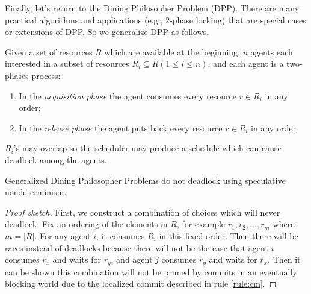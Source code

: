 Finally, let's return to the Dining Philosopher Problem (DPP).
There are many practical algorithms and applications (e.g., 2-phase locking)
that are special cases or extensions of DPP. So we generalize DPP as follows.
\begin{definition}
Given a set of resources $R$ which are available at the beginning, 
$n$ agents each interested in a subset of resources 
$R_i\subseteq R (1\le i\le n)$, and each agent is a two-phases process:
  \begin{enumerate}
    \item In the \emph{acquisition phase} the agent consumes every resource $r\in R_i$ in any order;
    \item In the \emph{release phase} the agent puts back every resource $r\in R_i$ in any order.
  \end{enumerate}
  $R_i$'s may overlap so the scheduler may produce a schedule which can cause deadlock 
among the agents.
\end{definition}

\begin{theorem} Generalized Dining Philosopher Problems do not deadlock 
using speculative nondeterminism.
\end{theorem}
\begin{proof}[Proof sketch]
First, we construct a combination of choices which will never deadlock. 
Fix an ordering of the elements in $R$, for example $r_1,r_2,\dots,r_m$ where $m=|R|$. 
For any agent $i$, it consumes $R_i$ in this fixed order. 
Then there will be races instead of deadlocks because there will not be the 
case that agent $i$ consumes $r_x$ and waits for $r_y$, and agent $j$ consumes
$r_y$ and waits for $r_x$. 
Then it can be shown this combination will not be pruned by commits in an 
eventually blocking world due to the localized commit described in rule \ref{rule:cm}. 
\end{proof}

